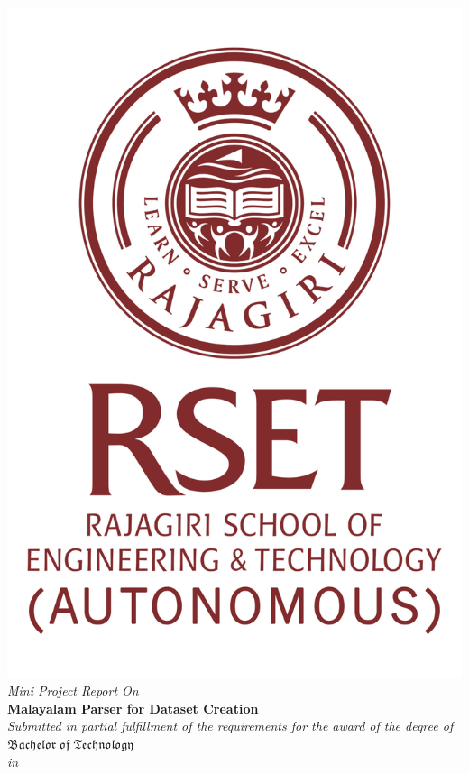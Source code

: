 \documentclass[12pt,a4paper,titlepage]{report}
\begin{document}
	\titlepage
	\thispagestyle{empty}
	\begin{center}
		\includegraphics[scale=0.3]{logo1.png}\\[0.5cm]
		\large \textit{Mini Project Report On}\\[0.6cm]
		\Large \textbf{Malayalam Parser for Dataset Creation }\\[0.6cm]
		\textit{Submitted in partial fulfillment of the
			requirements for the award of the degree of}\\[0.6cm]
		{\huge {$\mathfrak {Bachelor\; of\; Technology}$}}\\[.2cm]
		\textit{in}\\[.2cm]

\end{center}
\end{document}

